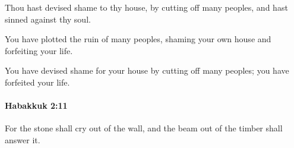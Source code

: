			\begin{versebox}
					\item[BHS] 
					\item[LXX] 
					\item[ASV] Thou hast devised shame to thy house, by cutting off many peoples, and hast sinned against thy soul.
					\item[NIV] You have plotted the ruin of many peoples, shaming your own house and forfeiting your life.
					\item[NRSV] You have devised shame for your house by cutting off many peoples; you have forfeited your life.
			\end{versebox}

		\paragraph{Habakkuk 2:11} %
			\label{HABAKKUK-2-11}

			For the stone shall cry out of the wall, and the beam out of the timber shall answer it.

